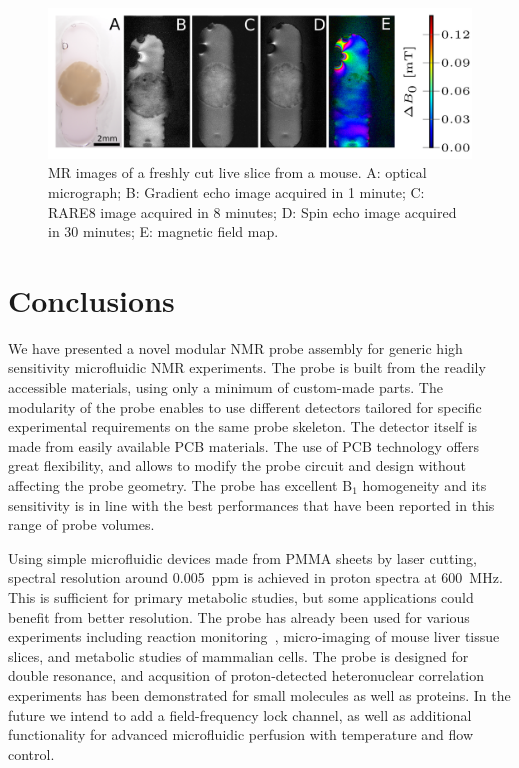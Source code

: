 \documentclass[preprint,5p]{elsarticle}
\begin{document}
\begin{figure}
\centering
\includegraphics[width=\linewidth,keepaspectratio=true]{./figures/ms5n17-tisli-im-180511.png}
\caption{MR images of a freshly cut live slice from a mouse. A: optical micrograph; B: Gradient echo image acquired in 1 minute; C: RARE8 image acquired in 8 minutes; D: Spin echo image acquired in 30 minutes; E: magnetic field map.}
\label{fig:tisli}
\end{figure}


\section{Conclusions}
We have presented a novel modular NMR probe assembly for generic high
sensitivity microfluidic NMR experiments.
The probe is built from the readily accessible materials, using only a minimum
of custom-made parts.
The modularity of the probe enables to use different detectors
tailored for specific experimental requirements on the same probe skeleton.
The detector itself is made from easily available PCB materials.
The use of PCB technology offers great flexibility, and allows to modify the
probe circuit and design without affecting the probe geometry.
The probe has excellent B$_1$ homogeneity and its sensitivity is in line with
the best performances that have been reported in this range of probe volumes.

Using simple microfluidic devices made from PMMA sheets by laser cutting,
spectral resolution around 0.005~ppm is achieved in proton spectra at
600~MHz. This is sufficient for primary metabolic studies, but some
applications could benefit from better resolution. The probe has already been
used for various  experiments including reaction monitoring~\cite{Fang-2018},
micro-imaging of mouse liver tissue slices, and metabolic studies of
mammalian cells. The probe is designed for double resonance, and
acqusition of proton-detected heteronuclear correlation experiments
has been demonstrated for small molecules as well as proteins.
In the future we intend to add a field-frequency lock channel,
as well as additional functionality for advanced microfluidic perfusion with temperature and flow control.
\end{document}
